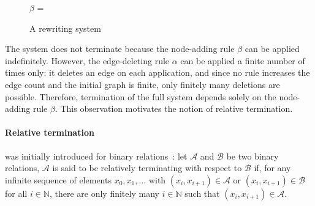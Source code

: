 \begin{figure}[H]

        $\beta$ ={
        }
    \caption{A rewriting system}
    \label{fig:intro:edge_deletion_and_node_addition_rule}
  \end{figure}
The system does not terminate because the node-adding rule $\beta$ can be applied indefinitely. However, the edge-deleting rule $\alpha$ can be applied a finite number of times only: it deletes an edge on each application, and since no rule increases the edge count and the initial graph is finite, only finitely many deletions are possible. Therefore, termination of the full system depends solely on the node-adding rule $\beta$. This observation motivates the notion of relative termination.

\paragraph{Relative termination} was initially introduced for binary relations~\cite{klop1987term}: let $\mathcal{A}$ and $\mathcal{B}$ be two binary relations, $\mathcal{A}$ is said to be relatively terminating with respect to $\mathcal{B}$ if, for any infinite sequence of elements \( x_0, x_1, \ldots \) with \( (x_i,x_{i+1}) \in \mathcal{A} \) or \( (x_i,x_{i+1}) \in \mathcal{B} \) for all \( i \in \mathbb{N} \), there are only finitely many \( i \in \mathbb{N} \) such that \( (x_i,x_{i+1}) \in \mathcal{A} \).

